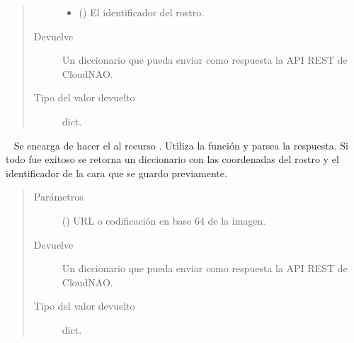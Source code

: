 \begin{fulllineitems}
\begin{fulllineitems}
\begin{fulllineitems}
\begin{quote}
\begin{description}
\begin{itemize}
\item {} 
 () \textendash{} El identificador del rostro.

\end{itemize}

\item[{Devuelve}] \leavevmode
Un diccionario que pueda enviar como respuesta la API REST de CloudNAO.

\item[{Tipo del valor devuelto}] \leavevmode
dict.

\end{description}\end{quote}

\end{fulllineitems}


\begin{fulllineitems}
\label{\detokenize{chapter_two/desc_cloudnao:app.tpa_client_libraries.kairos_client.Kairos.recognize}}~
Se encarga de hacer el  al recurso . Utiliza la
función {\hyperref[\detokenize{chapter_two/desc_cloudnao:app.utils.requests_utils.make_request}]{}} y parsea la
respuesta. Si todo fue exitoso se retorna
un diccionario con las coordenadas del rostro y
el identificador de la cara que se guardo previamente.
\begin{quote}\begin{description}
\item[{Parámetros}] \leavevmode
{} () \textendash{} URL o codificación en base 64 de la imagen.

\item[{Devuelve}] \leavevmode
Un diccionario que pueda enviar como respuesta la API REST de CloudNAO.

\item[{Tipo del valor devuelto}] \leavevmode
dict.

\end{description}\end{quote}

\end{fulllineitems}


\end{fulllineitems}


\end{fulllineitems}
